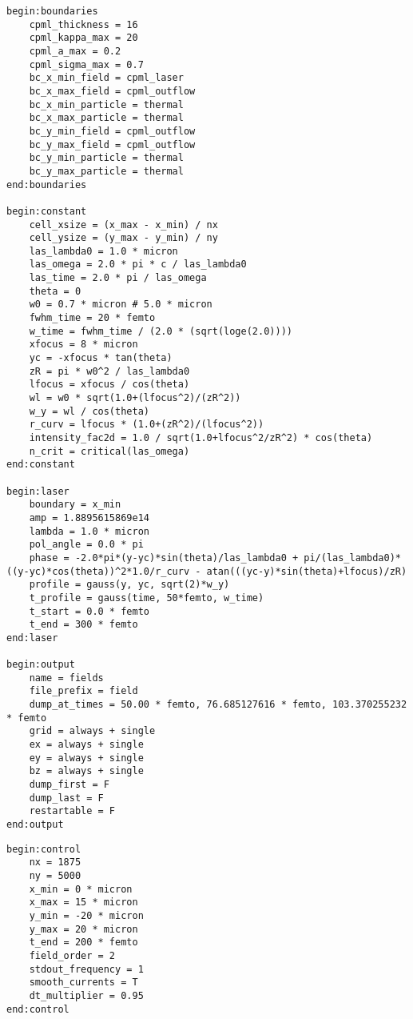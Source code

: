 \begin{multicols}{2}
\begin{lstlisting}[style=CXX, caption={Input file for identifying the conditions for which the propagation of the laser beam under the paraxial approximation is valid (chapter 4).\vspace{1mm}}]
begin:boundaries
	cpml_thickness = 16
	cpml_kappa_max = 20
	cpml_a_max = 0.2
	cpml_sigma_max = 0.7
	bc_x_min_field = cpml_laser
	bc_x_max_field = cpml_outflow
	bc_x_min_particle = thermal
	bc_x_max_particle = thermal
	bc_y_min_field = cpml_outflow
	bc_y_max_field = cpml_outflow
	bc_y_min_particle = thermal
	bc_y_max_particle = thermal
end:boundaries

begin:constant
	cell_xsize = (x_max - x_min) / nx
	cell_ysize = (y_max - y_min) / ny
	las_lambda0 = 1.0 * micron                            
	las_omega = 2.0 * pi * c / las_lambda0                    
	las_time = 2.0 * pi / las_omega                          
	theta = 0                                                                              
	w0 = 0.7 * micron # 5.0 * micron                                     
	fwhm_time = 20 * femto                                         
	w_time = fwhm_time / (2.0 * (sqrt(loge(2.0))))
	xfocus = 8 * micron                                         
	yc = -xfocus * tan(theta)                                      
	zR = pi * w0^2 / las_lambda0                                  
	lfocus = xfocus / cos(theta)                                   
	wl = w0 * sqrt(1.0+(lfocus^2)/(zR^2))                        
	w_y = wl / cos(theta)                                         
	r_curv = lfocus * (1.0+(zR^2)/(lfocus^2))                
	intensity_fac2d = 1.0 / sqrt(1.0+lfocus^2/zR^2) * cos(theta)   
	n_crit = critical(las_omega)                                   
end:constant

begin:laser
	boundary = x_min
	amp = 1.8895615869e14
	lambda = 1.0 * micron
	pol_angle = 0.0 * pi
	phase = -2.0*pi*(y-yc)*sin(theta)/las_lambda0 + pi/(las_lambda0)*((y-yc)*cos(theta))^2*1.0/r_curv - atan(((yc-y)*sin(theta)+lfocus)/zR)
	profile = gauss(y, yc, sqrt(2)*w_y)
	t_profile = gauss(time, 50*femto, w_time)
	t_start = 0.0 * femto
	t_end = 300 * femto
end:laser

begin:output
	name = fields
	file_prefix = field
	dump_at_times = 50.00 * femto, 76.685127616 * femto, 103.370255232 * femto
	grid = always + single
	ex = always + single
	ey = always + single
	bz = always + single
	dump_first = F
	dump_last = F
	restartable = F
end:output
\end{lstlisting}

\begin{lstlisting}[style=CXX, caption={Input file for the large-scale simulations of tightly focused laser beams interacting with solid targets (chapter 5).\vspace{1mm}}]
begin:control
	nx = 1875
	ny = 5000
	x_min = 0 * micron
	x_max = 15 * micron
	y_min = -20 * micron
	y_max = 20 * micron
	t_end = 200 * femto
	field_order = 2
	stdout_frequency = 1
	smooth_currents = T
	dt_multiplier = 0.95
end:control


\end{lstlisting}
\end{multicols}

